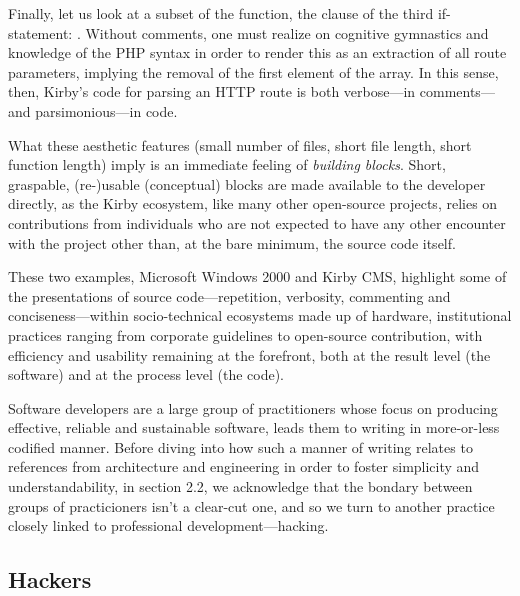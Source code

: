 Finally, let us look at a subset of the function, the clause of the third if-statement: . Without comments, one must realize on cognitive gymnastics and knowledge of the PHP syntax in order to render this as an extraction of all route parameters, implying the removal of the first element of the array. In this sense, then, Kirby's code for parsing an HTTP route is both verbose—in comments—and parsimonious—in code.

What these aesthetic features (small number of files, short file length, short function length) imply is an immediate feeling of \emph{building blocks}. Short, graspable, (re-)usable (conceptual) blocks are made available to the developer directly, as the Kirby ecosystem, like many other open-source projects, relies on contributions from individuals who are not expected to have any other encounter with the project other than, at the bare minimum, the source code itself.

\vspace*{1\baselineskip}

These two examples, Microsoft Windows 2000 and Kirby CMS, highlight some of the presentations of source code—repetition, verbosity, commenting and conciseness—within socio-technical ecosystems made up of hardware, institutional practices ranging from corporate guidelines to open-source contribution, with efficiency and usability remaining at the forefront, both at the result level (the software) and at the process level (the code).

Software developers are a large group of practitioners whose focus  on producing effective, reliable and sustainable software, leads them to writing in more-or-less codified manner. Before diving into how such a manner of writing relates to references from architecture and engineering in order to foster simplicity and understandability, in section 2.2, we acknowledge that the bondary between groups of practicioners isn't a clear-cut one, and so we turn to another practice closely linked to professional development—hacking.

\subsection{Hackers}

